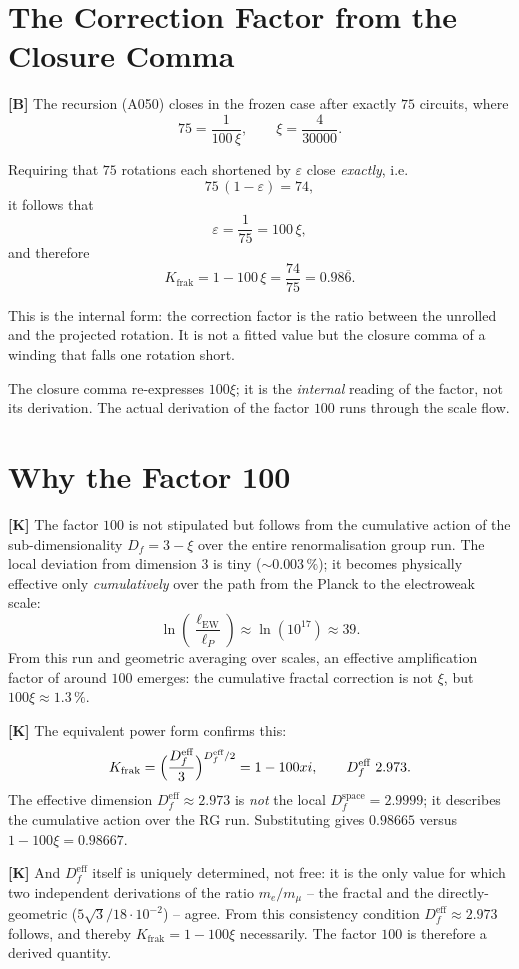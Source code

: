 \section{The Correction Factor from the Closure Comma}

\textbf{[B]} The recursion (A050) closes in the frozen case after exactly
$75$ circuits, where
\[
  75 = \frac{1}{100\,\xi}, \qquad \xi = \frac{4}{30000}.
\]

Requiring that $75$ rotations each shortened by $\varepsilon$ close \emph{exactly}, i.e.\
\[
  75\,(1-\varepsilon) = 74 ,
\]
it follows that
\[
  \varepsilon = \frac{1}{75} = 100\,\xi ,
\]
and therefore
\[
  K_\text{frak} = 1 - 100\,\xi = \frac{74}{75} = 0{.}98\overline{6}.
\]

This is the internal form: the correction factor is the ratio between the
unrolled and the projected rotation. It is not a fitted value but the closure
comma of a winding that falls one rotation short.

The closure comma re-expresses $100\xi$; it is the \emph{internal} reading of
the factor, not its derivation. The actual derivation of the factor $100$ runs
through the scale flow.

\section{Why the Factor 100}

\textbf{[K]} The factor $100$ is not stipulated but follows from the cumulative
action of the sub-dimensionality $D_f = 3-\xi$ over the entire renormalisation
group run. The local deviation from dimension $3$ is tiny ($\sim 0{.}003\,\%$);
it becomes physically effective only \emph{cumulatively} over the path from
the Planck to the electroweak scale:
\[
  \ln\!\left(\frac{\ell_\text{EW}}{\ell_P}\right) \approx \ln(10^{17}) \approx 39 .
\]
From this run and geometric averaging over scales, an effective amplification
factor of around $100$ emerges: the cumulative fractal correction is not $\xi$,
but $100\xi \approx 1{.}3\,\%$.

\textbf{[K]} The equivalent power form confirms this:
\[
  K_\text{frak} = \Bigl(\frac{D_f^\text{eff}}{3}\Bigr)^{D_f^\text{eff}/2}
  = 1-100\xi, \qquad D_f^\text{eff} \approx 2{.}973 .
\]
The effective dimension $D_f^\text{eff}\approx 2{.}973$ is \emph{not} the local
$D_f^\text{space}=2{.}9999$; it describes the cumulative action over the RG run.
Substituting gives $0{.}98665$ versus $1-100\xi = 0{.}98667$.

\textbf{[K]} And $D_f^\text{eff}$ itself is uniquely determined, not free: it
is the only value for which two independent derivations of the ratio $m_e/m_\mu$
-- the fractal and the directly-geometric ($5\sqrt3/18\cdot10^{-2}$) -- agree.
From this consistency condition $D_f^\text{eff}\approx 2{.}973$ follows, and
thereby $K_\text{frak}=1-100\xi$ necessarily. The factor $100$ is therefore a
derived quantity.

